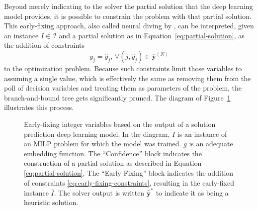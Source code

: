 Beyond merely indicating to the solver the partial solution that the deep learning model provides, it is possible to constrain the problem with that partial solution.
This early-fixing approach, also called neural diving by , can be interpreted, given an instance $I\in \mathcal{I}$ and a partial solution as in Equation~\eqref{eq:partial-solution}, as the addition of constraints
\begin{equation}\label{eq:early-fixing-constraints}
    y_{j} = \hat{y}_j,\,\forall (j,\hat{y}_j) \in \overline{\bm{y}}^{(N)}
\end{equation}
to the optimization problem.
Because such constraints limit those variables to assuming a single value, which is effectively the same as removing them from the poll of decision variables and treating them as parameters of the problem, the branch-and-bound tree gets significantly pruned.
The diagram of Figure~\ref{fig:early-fixing-diagram} illustrates this process.

\begin{figure}[h]
    \centering
    \caption{Early-fixing integer variables based on the output of a solution prediction deep learning model. In the diagram,  $I$ is an instance of an MILP problem for which the model was trained. $g$ is an adequate embedding function. The ``Confidence'' block indicates the construction of a partial solution as described in Equation \eqref{eq:partial-solution}. The ``Early Fixing'' block indicates the addition of constraints \eqref{eq:early-fixing-constraints}, resulting in the early-fixed instance $\overline{I}$. The solver output is written $\hat{\bm{y}}^*$ to indicate it as being a heuristic solution.}
    \label{fig:early-fixing-diagram}
\end{figure}

